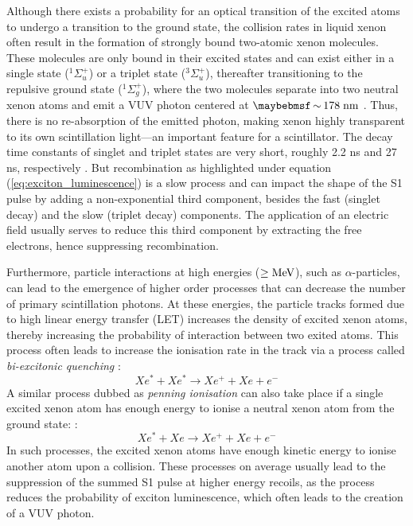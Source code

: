 Although there exists a probability for an optical transition of the excited atoms to undergo a transition to the ground state, the collision rates in liquid xenon often result in the formation of strongly bound two-atomic xenon molecules. These molecules are only bound in their excited states and can exist either in a single state ($^{1}\Sigma^{+}_{u}$) or a triplet state ($^{3}\Sigma^{+}_{u}$), thereafter transitioning to the repulsive ground state ($^{1}\Sigma^{+}_{g}$), where the two molecules separate into two neutral xenon atoms and emit a VUV photon centered at $\sim 178 \; \MathText{nm}$ \cite{FUJII2015293}. Thus, there is no re-absorption of the emitted photon, making xenon highly transparent to its own scintillation light---an important feature for a scintillator. The decay time constants of singlet and triplet states are very short, roughly 2.2 ns and 27 ns, respectively \cite{xenon_physics}. But recombination as highlighted under equation (\ref{eq:exciton_luminescence}) is a slow process and can impact the shape of the S1 pulse by adding a non-exponential third component, besides the fast (singlet decay) and the slow (triplet decay) components. The application of an electric field usually serves to reduce this third component by extracting the free electrons, hence suppressing recombination.

Furthermore, particle interactions at high energies ($\geq{}\text{MeV}$), such as $\alpha$-particles, can lead to the emergence of higher order processes that can decrease the number of primary scintillation photons. At these energies, the particle tracks formed due to high linear energy transfer (LET) increases the density of excited xenon atoms, thereby increasing the probability of interaction between two exited atoms. This process often leads to increase the ionisation rate in the track via a process called \textit{bi-excitonic quenching} \cite{bi_excitonic}:
%
\begin{equation} \label{eq:bi-excitonic_quenching}
    Xe^{\ast} + Xe^{\ast} \rightarrow Xe^{+} + Xe + e^{-}
\end{equation} 
%
A similar process dubbed as \textit{penning ionisation} can also take place if a single excited xenon atom has enough energy to ionise a neutral xenon atom from the ground state:
\cite{Dahl}:
%
\begin{equation} \label{eq:bi-excitonic_quenching}
    Xe^{\ast} + Xe \rightarrow Xe^{+} + Xe + e^{-}
\end{equation} 
%
In such processes, the excited xenon atoms have enough kinetic energy to ionise another atom upon a collision. These processes on average usually lead to the suppression of the summed S1 pulse at higher energy recoils, as the process reduces the probability of exciton luminescence, which often leads to the creation of a VUV photon.


